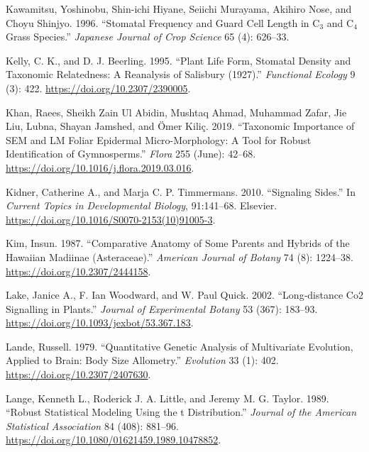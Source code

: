 \documentclass[
  12pt,
]{article}
\newlength{\cslhangindent}
\newlength{\cslentryspacingunit} %
\newenvironment{CSLReferences}[2] %
 {%
  \setlength{\parindent}{0pt}
  \ifodd #1
  \let\oldpar\par
  \def\par{\hangindent=\cslhangindent\oldpar}
  \fi
  \setlength{\parskip}{#2\cslentryspacingunit}
 }%
 {}
\begin{document}
\begin{CSLReferences}{1}{0}
\leavevmode{}%
Kawamitsu, Yoshinobu, Shin-ichi Hiyane, Seiichi Murayama, Akihiro Nose, and Choyu Shinjyo. 1996. {``Stomatal Frequency and Guard Cell Length in {C}\(_{\textrm{3}}\) and {C}\(_{\textrm{4}}\) Grass Species.''} \emph{Japanese Journal of Crop Science} 65 (4): 626--33.

\leavevmode{}%
Kelly, C. K., and D. J. Beerling. 1995. {``Plant {Life} {Form}, {Stomatal} {Density} and {Taxonomic} {Relatedness}: {A} {Reanalysis} of {Salisbury} (1927).''} \emph{Functional Ecology} 9 (3): 422. \url{https://doi.org/10.2307/2390005}.

\leavevmode{}%
Khan, Raees, Sheikh Zain Ul Abidin, Mushtaq Ahmad, Muhammad Zafar, Jie Liu, Lubna, Shayan Jamshed, and Ömer Kiliç. 2019. {``Taxonomic Importance of {SEM} and {LM} Foliar Epidermal Micro-Morphology: {A} Tool for Robust Identification of Gymnosperms.''} \emph{Flora} 255 (June): 42--68. \url{https://doi.org/10.1016/j.flora.2019.03.016}.

\leavevmode{}%
Kidner, Catherine A., and Marja C. P. Timmermans. 2010. {``Signaling {Sides}.''} In \emph{Current {Topics} in {Developmental} {Biology}}, 91:141--68. Elsevier. \url{https://doi.org/10.1016/S0070-2153(10)91005-3}.

\leavevmode{}%
Kim, Insun. 1987. {``Comparative {Anatomy} of {Some} {Parents} and {Hybrids} of the {Hawaiian} {Madiinae} ({Asteraceae}).''} \emph{American Journal of Botany} 74 (8): 1224--38. \url{https://doi.org/10.2307/2444158}.

\leavevmode{}%
Lake, Janice A., F. Ian Woodward, and W. Paul Quick. 2002. {``Long‐distance {Co2} Signalling in Plants.''} \emph{Journal of Experimental Botany} 53 (367): 183--93. \url{https://doi.org/10.1093/jexbot/53.367.183}.

\leavevmode{}%
Lande, Russell. 1979. {``Quantitative {Genetic} {Analysis} of {Multivariate} {Evolution}, {Applied} to {Brain}: {Body} {Size} {Allometry}.''} \emph{Evolution} 33 (1): 402. \url{https://doi.org/10.2307/2407630}.

\leavevmode{}%
Lange, Kenneth L., Roderick J. A. Little, and Jeremy M. G. Taylor. 1989. {``Robust {Statistical} {Modeling} {Using} the t {Distribution}.''} \emph{Journal of the American Statistical Association} 84 (408): 881--96. \url{https://doi.org/10.1080/01621459.1989.10478852}.


\end{CSLReferences}
\end{document}
